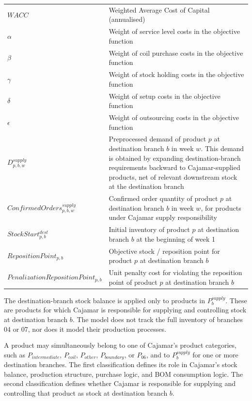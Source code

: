 \documentclass{article}
\begin{document}
\begin{longtable}{l p{8cm}}
$WACC$ & Weighted Average Cost of Capital (annualised)\\
$\alpha$ & Weight of service level costs in the objective function \\
$\beta$ & Weight of coil purchase costs in the objective function \\
$\gamma$ & Weight of stock holding costs in the objective function \\
$\delta$ & Weight of setup costs in the objective function \\
$\epsilon$ & Weight of outsourcing costs in the objective function \\
\hline
$D^{supply}_{p,b,w}$ & Preprocessed demand of product $p$ at destination branch $b$ in week $w$. This demand is obtained by expanding destination-branch requirements backward to Cajamar-supplied products, net of relevant downstream stock at the destination branch \\
$ConfirmedOrders^{supply}_{p,b,w}$ & Confirmed order quantity of product $p$ at destination branch $b$ in week $w$, for products under Cajamar supply responsibility \\
$StockStart^{dest}_{p,b}$ & Initial inventory of product $p$ at destination branch $b$ at the beginning of week 1 \\
$RepositionPoint_{p,b}$ & Objective stock / reposition point for product $p$ at destination branch $b$ \\
$PenalizationRepositionPoint_{p,b}$ & Unit penalty cost for violating the reposition point of product $p$ at destination branch $b$ \\
\end{longtable}

\FloatBarrier

The destination-branch stock balance is applied only to products in $P^{supply}_b$. 
These are products for which Cajamar is responsible for supplying and controlling stock at destination branch $b$. 
The model does not track the full inventory of branches 04 or 07, nor does it model their production processes. 

A product may simultaneously belong to one of Cajamar's product categories, such as 
$P_{intermediate}$, $P_{coil}$, $P_{other}$, $P_{boundary}$, or $P_{06}$, 
and to $P^{supply}_b$ for one or more destination branches. 
The first classification defines its role in Cajamar's stock balance, production structure, purchase logic, and BOM consumption logic. 
The second classification defines whether Cajamar is responsible for supplying and controlling that product as stock at destination branch $b$. 
\end{document}
